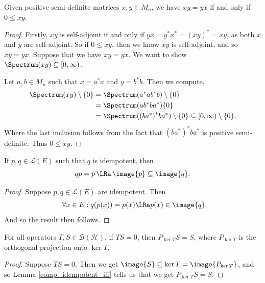 \begin{lemma}\label{posSemidef_iff_commute}
  \leanok
  Given positive semi-definite matrices $x,y\in M_n$, we have $xy=yx$ if and only if $0\leq{xy}$.
 \end{lemma}
 \begin{proof}\leanok
  Firstly, $xy$ is self-adjoint if and only if $yx=y^*x^*=(xy)^*=xy$, as both $x$ and $y$ are self-adjoint.
  So if $0\leq xy$, then we know $xy$ is self-adjoint, and so $xy=yx$.
  Suppose that we have $xy=yx$. We want to show $\Spectrum(xy)\subseteq[0,\infty)$.
 
  Let $a,b\in M_n$ such that $x=a^*a$ and $y=b^*b$. Then we compute,
  \begin{align*}
   \Spectrum(xy)\setminus\{0\} &= \Spectrum(a^*ab^*b)\setminus\{0\}\\
   &= \Spectrum(ab^*ba^*)\{0\}\\
   &= \Spectrum({(ba^*)}^*ba^*)\setminus\{0\}\subseteq[0,\infty)\setminus\{0\}.
  \end{align*}
  Where the last inclusion follows from the fact that ${(ba^*)}^*ba^*$ is positive semi-definite.
  Thus $0\leq xy$.
 \end{proof}

 \begin{lemma}\label{comp_idempotent_iff}
  \leanok
  If $p,q\in \mathcal{L}(E)$ such that $q$ is idempotent, then
  \[qp=p \,\LRa\, \image{p}\subseteq\image{q}.\]
 \end{lemma}
 \begin{proof}\leanok
  Suppose $p,q\in\mathcal{L}(E)$ are idempotent. Then
  \begin{align*}
   &\quad\;\;\forall{x}\in{E}:q(p(x))=p(x) \LRa p(x)\in\image{q}.
  \end{align*}
  And so the result then follows.
 \end{proof}

 \begin{corollary}\label{orthogonalProjection_ker_comp_eq_of_comp_eq_zero}
  \leanok
  For all operators $T,S\in\mathcal{B}(\mathcal{H})$, if $TS=0$, then $P_{\ker{T}}S=S$, where $P_{\ker{T}}$ is the orthogonal projection onto $\ker{T}$.
 \end{corollary}
 \begin{proof}\leanok
  Suppose $TS=0$. Then we get $\image{S}\subseteq\ker{T}=\image{P_{\ker{T}}}$, and so Lemma \ref{comp_idempotent_iff} tells us that we get $P_{\ker{T}}S=S$.
 \end{proof}


